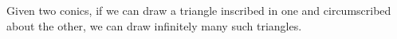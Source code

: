  Given two conics, if we can draw a triangle inscribed in one and
circumscribed about the other, we can draw infinitely many such
triangles.
